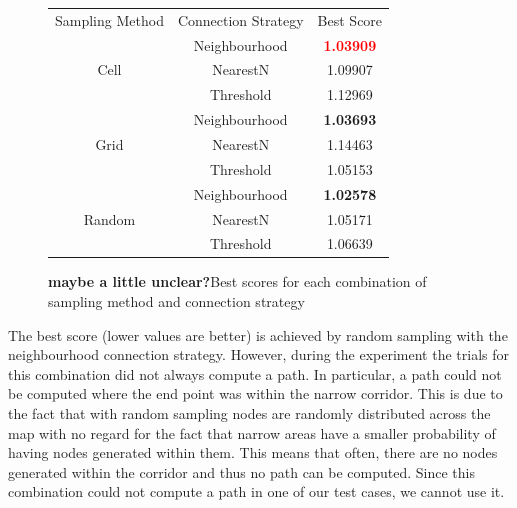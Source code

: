 \documentclass[conference]{IEEEtran}
\begin{document}
\begin{figure}
  \centering
  \begin{tabular}{|c|c|c|}
    \cline{1-3}
    Sampling Method & Connection Strategy & Best Score      \\ \cline{1-3}
    \multirow{3}{*}{Cell} & Neighbourhood & \textbf{\textcolor{red}{1.03909}}         \\ \cline{2-3}
    & NearestN  & 1.09907                                     \\ \cline{2-3}
    & Threshold & 1.12969                                       \\ \cline{1-3}
    \multirow{3}{*}{Grid} & Neighbourhood & \textbf{1.03693}                          \\ \cline{2-3}
    & NearestN & 1.14463                                        \\ \cline{2-3}
    & Threshold & 1.05153                                       \\ \cline{1-3}
    \multirow{3}{*}{Random} & Neighbourhood & \textbf{1.02578}                        \\ \cline{2-3}
    & NearestN & 1.05171                                      \\ \cline{2-3}
    & Threshold & 1.06639                                     \\ \cline{1-3}
 \end{tabular}
  \caption{\textbf{maybe a little unclear?}Best scores for each combination of sampling method and connection strategy}
  \label{fig:sampleconntable}
\end{figure}

The best score (lower values are better) is achieved by random sampling with the neighbourhood connection strategy. However, during the experiment the trials for this combination did not always compute a path. In particular, a path could not be computed where the end point was within the narrow corridor. This is due to the fact that with random sampling nodes are randomly distributed across the map with no regard for the fact that narrow areas have a smaller probability of having nodes generated within them. This means that often, there are no nodes generated within the corridor and thus no path can be computed. Since this combination could not compute a path in one of our test cases, we cannot use it.
\end{document}
